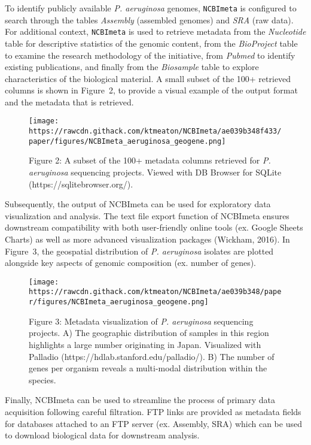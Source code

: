 \documentclass[
]{article}
\begin{document}
To identify publicly available \emph{P. aeruginosa} genomes,
\texttt{NCBImeta} is configured to search through the tables
\emph{Assembly} (assembled genomes) and \emph{SRA} (raw data). For
additional context, \texttt{NCBImeta} is used to retrieve metadata from
the \emph{Nucleotide} table for descriptive statistics of the genomic
content, from the \emph{BioProject} table to examine the research
methodology of the initiative, from \emph{Pubmed} to identify existing
publications, and finally from the \emph{Biosample} table to explore
characteristics of the biological material. A small subset of the 100+
retrieved columns is shown in Figure~2, to provide a visual example of
the output format and the metadata that is retrieved.

\begin{figure}
\hypertarget{fig:NCBImeta_aeruginos_db_subset}{%
\centering
\texttt{[image: https://rawcdn.githack.com/ktmeaton/NCBImeta/ae039b348f433/paper/figures/NCBImeta\_aeruginosa\_geogene.png]}
\caption{Figure 2: A subset of the 100+ metadata columns retrieved for
\emph{P. aeruginosa} sequencing projects. Viewed with DB Browser for
SQLite
(https://sqlitebrowser.org/).}\label{fig:NCBImeta_aeruginos_db_subset}
}
\end{figure}

Subsequently, the output of NCBImeta can be used for exploratory data
visualization and analysis. The text file export function of NCBImeta
ensures downstream compatibility with both user-friendly online tools
(ex. Google Sheets Charts) as well as more advanced visualization
packages (Wickham, 2016). In Figure~3, the geospatial distribution of
\emph{P. aeruginosa} isolates are plotted alongside key aspects of
genomic composition (ex. number of genes).

\begin{figure}
\hypertarget{fig:NCBImeta_aeruginosa_geogene}{%
\centering
\texttt{[image: https://rawcdn.githack.com/ktmeaton/NCBImeta/ae039b348/paper/figures/NCBImeta\_aeruginosa\_geogene.png]}
\caption{Figure 3: Metadata visualization of \emph{P. aeruginosa}
sequencing projects. A) The geographic distribution of samples in this
region highlights a large number originating in Japan. Visualized with
Palladio (https://hdlab.stanford.edu/palladio/). B) The number of genes
per organism reveals a multi-modal distribution within the
species.}\label{fig:NCBImeta_aeruginosa_geogene}
}
\end{figure}

Finally, NCBImeta can be used to streamline the process of primary data
acquisition following careful filtration. FTP links are provided as
metadata fields for databases attached to an FTP server (ex. Assembly,
SRA) which can be used to download biological data for downstream
analysis.
\end{document}
